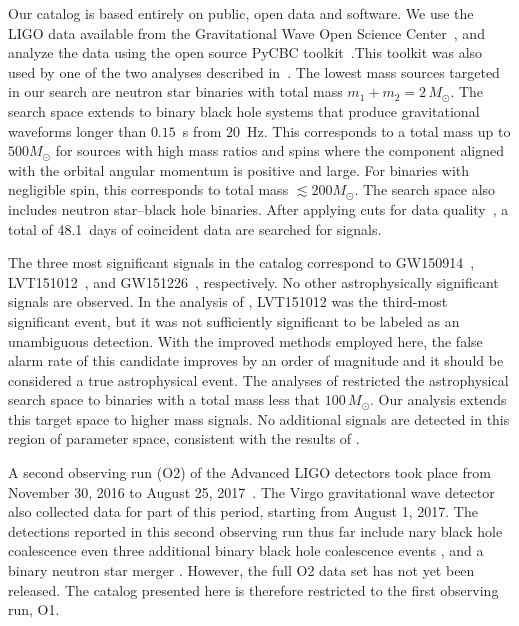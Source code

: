 Our catalog is based entirely on public, open data and software. We use the LIGO data available from the Gravitational Wave Open Science Center~\citep{Vallisneri:2014vxa}, and analyze the data using the open source PyCBC toolkit~\citep{Usman:2015kfa,Canton:2014ena,pycbc-github}.This toolkit was also used by one of the two analyses described in~\cite{TheLIGOScientific:2016qqj}. The lowest mass sources targeted in our search are neutron star binaries with total mass $m_1 + m_2 = 2\, M_\odot$. The search space extends to binary black hole systems that produce gravitational waveforms longer than $0.15$~s from $20$~Hz. This corresponds to a total mass up to $500 M_{\odot}$ for sources with high mass ratios and spins where the component aligned with the orbital angular momentum is positive and large. For binaries with negligible spin, this corresponds to total mass $\lesssim 200 M_{\odot}$. The search space also includes neutron star--black hole binaries. After applying cuts for data quality~\citep{TheLIGOScientific:2016zmo,TheLIGOScientific:2017lwt}, a total of 48.1~days of coincident data are searched for signals.

The three most significant signals in the catalog correspond to GW150914~\citep{Abbott:2016blz}, LVT151012~\citep{Abbott:2016blz,TheLIGOScientific:2016pea}, and GW151226~\citep{Abbott:2016nmj}, respectively. No other astrophysically significant signals are observed. In the analysis of \cite{TheLIGOScientific:2016pea}, LVT151012 was the third-most significant event, but it was not sufficiently significant to be labeled as an unambiguous detection. With the improved methods employed here, the false alarm rate of this candidate improves by an order of magnitude and it should be considered a true astrophysical event. The analyses of \cite{TheLIGOScientific:2016pea,Abbott:2016ymx} restricted the astrophysical search space to binaries with a total mass less that $100\,M_\odot$. Our analysis extends this target space to higher mass signals. No additional signals are detected in this region of parameter space, consistent with the results of \cite{Abbott:2017iws}. 

A second observing run (O2) of the Advanced LIGO detectors took place from November 30, 2016 to August 25, 2017~\citep{Aasi:2013wya}.  The Virgo gravitational wave detector also collected data for part of this period, starting from August 1, 2017.  The detections reported in this second observing run thus far include nary black hole coalescence even three additional binary black hole coalescence events \citep{Abbott:2017vtc,Abbott:2017gyy,Abbott:2017oio}, and a binary neutron star merger \citep{TheLIGOScientific:2017qsa}. However, the full O2 data set has not yet been released. The catalog presented here is therefore restricted to the first observing run, O1.

